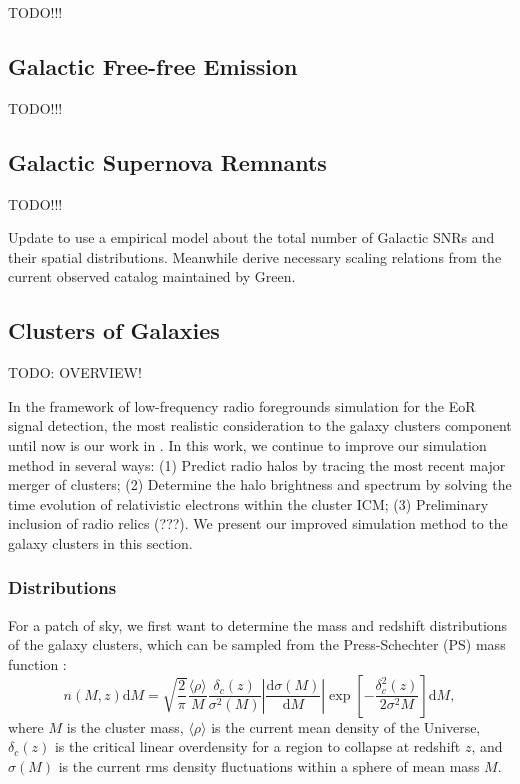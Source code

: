\documentclass[modern]{aastex61}
\newcommand{\D}[1]{\mathrm{d} #1}
\newcommand{\diff}[2]{\frac{\D{#1}}{\D{#2}}}
\begin{document}
TODO!!!

\subsection{Galactic Free-free Emission}
\label{sec:fg-gfree}

TODO!!!

\subsection{Galactic Supernova Remnants}
\label{sec:fg-gsnr}

TODO!!!

Update to use a empirical model about the total number of Galactic SNRs
and their spatial distributions.  Meanwhile derive necessary scaling
relations from the current observed catalog maintained by Green.

\subsection{Clusters of Galaxies}
\label{sec:fg-clusters}

TODO: OVERVIEW!

In the framework of low-frequency radio foregrounds simulation for the
EoR signal detection, the most realistic consideration to the galaxy
clusters component until now is our work in \citeyear{wang2010} \citep{wang2010}.
In this work, we continue to improve our simulation method in several
ways:
(1) Predict radio halos by tracing the most recent major merger of clusters;
(2) Determine the halo brightness and spectrum by solving the time
evolution of relativistic electrons within the cluster ICM;
(3) Preliminary inclusion of radio relics (???).
We present our improved simulation method to the galaxy clusters in this
section.

\subsubsection{Distributions}
\label{sec:cluster-dist}

For a patch of sky, we first want to determine the mass and redshift
distributions of the galaxy clusters, which can be sampled from the
Press-Schechter (PS) mass function \citep{press1974}:
\begin{equation}
  \label{eq:ps-mass-func}
  n(M, z) \D{M} = \sqrt{\frac{2}{\pi}} \frac{\langle{\rho}\rangle}{M}
  \frac{\delta_c(z)}{\sigma^2(M)} \left| \diff{\sigma(M)}{M} \right|
  \exp\left[ -\frac{\delta_c^2(z)}{2\sigma^2{M}} \right] \D{M},
\end{equation}
where
$M$ is the cluster mass,
$\langle {\rho} \rangle$ is the current mean density of the Universe,
$\delta_c(z)$ is the critical linear overdensity for a region to collapse
at redshift $z$,
and $\sigma(M)$ is the current rms density fluctuations within a sphere
of mean mass $M$.
\end{document}
